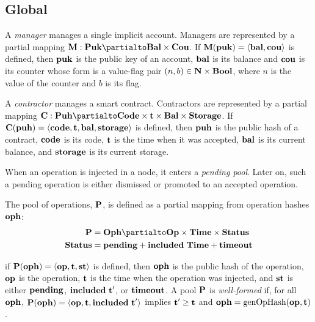 \documentclass[a4paper]{llncs}
\begin{document}
\subsection{Global}
\label{sec:global}



\begin{definition}%
A \emph{manager} manages a single implicit account. Managers are
represented by a partial mapping $\MANAGERS : \TPUK \partialto \TBAL
\times \TCOU$. If $\textbf{M} (\textbf{puk}) = \langle\textbf{bal}, \textbf{cou}\rangle$ is defined, then  $\textbf{puk}$ is the
public key of an account, $\textbf{bal}$ is its
balance and $\textbf{cou}$ is its counter whose form is a value-flag pair
$(n,b) \in \textbf{N}\times\textbf{Bool}$, where $n$ is the value of the counter
and ${b}$ is its flag.   
\end{definition}

\begin{definition}%
  A \emph{contractor} manages a smart contract. Contractors are
  represented by a partial mapping $\CONTRACTORS : \TPUH \partialto
  \TCODE \times \TIME  \times \TBAL \times  \TSTORAGE$. If $\textbf{C} (\textbf{puh}) = \langle
  \textbf{code}, \textbf{t}, \textbf{bal}, \textbf{storage} \rangle $ is defined, then $\textbf{puh}$ is the
  public hash of a contract,
  $\textbf{code}$ is its  code,
  $\textbf{t}$ is the time when it was accepted,
  $\textbf{bal}$ is its current balance,
  and $\textbf{storage}$ is its current storage.
\end{definition}

When an operation is injected in a node, it enters a \emph{pending
  pool}. Later on, such a pending operation is either dismissed or
promoted to an accepted operation.

\begin{definition}
  The pool of operations, $\textbf{P}$, is defined as a partial mapping from
  operation hashes $\textbf{oph}$: 
  \begin{align*}
    \PENDING &= \TOPH \partialto \TOP\times \TTIME \times \TSTATUS \\
    \TSTATUS&= \STATUSPENDING + \STATUSINCLUDED\ \TTIME + \STATUSTIMEOUT
  \end{align*}
  
  if $\textbf{P}(\textbf{oph}) = \langle  \textbf{op}, \textbf{t}, \textbf{st}
\rangle $ is defined, then $\textbf{oph}$ is the public hash of the operation, $\textbf{op}$ is the operation, $\textbf{t}$ is the time when the
operation was injected, and $\textbf{st}$ is either $\textbf{pending}$,
$\textbf{included}\ \textbf{t}'$, or $\textbf{timeout}$.
A pool $\textbf{P}$ is \emph{well-formed} if, for all $\textbf{oph}$, $\textbf{P} (\textbf{oph}) =
  \langle\textbf{op},\textbf{t}, \textbf{included}\ \textbf{t}'\rangle$ implies $\textbf{t}' \ge
  \textbf{t}$ and $\textbf{oph} = \textup{genOpHash} (\textbf{op}, \textbf{t})$.
\end{definition}
\end{document}
